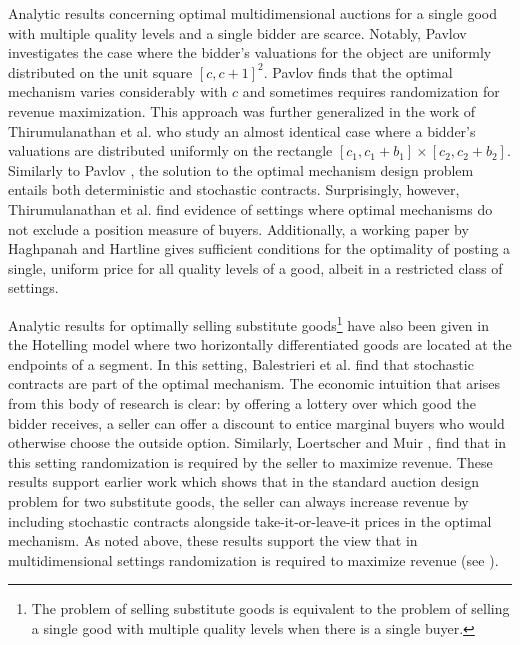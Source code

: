 Analytic results concerning optimal multidimensional auctions for a single good with multiple quality levels and a single bidder are scarce. Notably, Pavlov \autocite*{pavlov2011optimal} investigates the case where the bidder's valuations for the object are uniformly distributed on the unit square $[c,c+1]^2$. Pavlov finds that the optimal mechanism varies considerably with $c$ and sometimes requires randomization for revenue maximization. This approach was further generalized in the work of Thirumulanathan et al. \autocite*{thirumulanathan2019unitdemand} who study an almost identical case where a bidder's valuations are distributed uniformly on the rectangle $[c_1,c_1+b_1]\times[c_2,c_2+b_2]$. Similarly to Pavlov \autocite*{pavlov2011optimal}, the solution to the optimal mechanism design problem entails both deterministic and stochastic contracts. Surprisingly, however, Thirumulanathan et al. \autocite*{thirumulanathan2019unitdemand} find evidence of settings where optimal mechanisms do not exclude a position measure of buyers. Additionally, a working paper by Haghpanah and Hartline \autocite*{haghpanah2014} gives sufficient conditions for the optimality of posting a single, uniform price for all quality levels of a good, albeit in a restricted class of settings.

Analytic results for optimally selling substitute goods\footnote{The problem of selling substitute goods is equivalent to the problem of selling a single good with multiple quality levels when there is a single buyer.} have also been given in the Hotelling model \autocite{hotelling1929} where two horizontally differentiated goods are located at the endpoints of a segment. In this setting, Balestrieri et al. \autocite*{balestrieri2020} find that stochastic contracts are part of the optimal mechanism. The economic intuition that arises from this body of research is clear: by offering a lottery over which good the bidder receives, a seller can offer a discount to entice marginal buyers who would otherwise choose the outside option. Similarly, Loertscher and Muir \autocite*{loertscher2023}, find that in this setting randomization is required by the seller to maximize revenue. These results support earlier work \autocite{thanassoulis2004} which shows that in the standard auction design problem for two substitute goods, the seller can always increase revenue by including stochastic contracts alongside take-it-or-leave-it prices in the optimal mechanism. As noted above, these results support the view that in multidimensional settings randomization is required to maximize revenue (see \cite{daskalakis2015multi}). 

